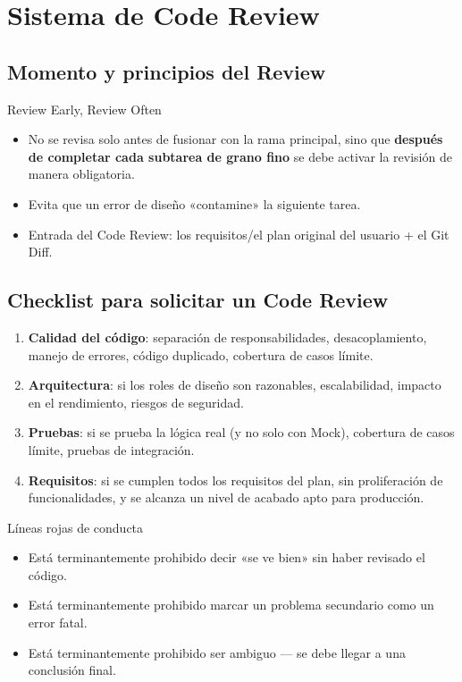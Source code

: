 \section{Sistema de Code Review}

\subsection{Momento y principios del Review}

\begin{importantbox}{{Review Early, Review Often}}
\begin{itemize}
    \item No se revisa solo antes de fusionar con la rama principal, sino que \textbf{después de completar cada subtarea de grano fino} se debe activar la revisión de manera obligatoria.
    \item Evita que un error de diseño «contamine» la siguiente tarea.
    \item Entrada del Code Review: los requisitos/el plan original del usuario + el Git Diff.
\end{itemize}
\end{importantbox}

\subsection{Checklist para solicitar un Code Review}

\begin{enumerate}
    \item \textbf{Calidad del código}: separación de responsabilidades, desacoplamiento, manejo de errores, código duplicado, cobertura de casos límite.
    \item \textbf{Arquitectura}: si los roles de diseño son razonables, escalabilidad, impacto en el rendimiento, riesgos de seguridad.
    \item \textbf{Pruebas}: si se prueba la lógica real (y no solo con Mock), cobertura de casos límite, pruebas de integración.
    \item \textbf{Requisitos}: si se cumplen todos los requisitos del plan, sin proliferación de funcionalidades, y se alcanza un nivel de acabado apto para producción.
\end{enumerate}

\begin{warningbox}{Líneas rojas de conducta}
\begin{itemize}
    \item Está terminantemente prohibido decir «se ve bien» sin haber revisado el código.
    \item Está terminantemente prohibido marcar un problema secundario como un error fatal.
    \item Está terminantemente prohibido ser ambiguo — se debe llegar a una conclusión final.
\end{itemize}
\end{warningbox}

